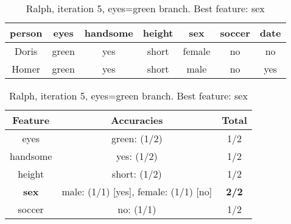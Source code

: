 \begin{table}[h!]
  \centering
  \begin{tabular}{cccccc|c}
    \toprule
    person      & eyes  & handsome & height & sex    & soccer & date\\
    \midrule
    Doris       & green & yes      & short  & female & no     & no  \\
    Homer       & green & yes      & short  & male   & no     & yes \\
    \bottomrule
  \end{tabular}

  \vspace{.5cm}

  \begin{tabular}{ccc}
    \toprule
    Feature           & Accuracies                              & Total\\
    \midrule
    eyes              & green: (1/2)                            & 1/2\\
    handsome          & yes: (1/2)                              & 1/2\\
    height            & short: (1/2)                            & 1/2\\
    \textbf{sex}      & male: (1/1) [yes], female: (1/1) [no]   & \textbf{2/2}\\
    soccer            & no: (1/1)                               & 1/2\\
    \bottomrule
  \end{tabular}
  \caption*{Ralph, iteration 5, eyes=green branch. Best feature: sex}
\end{table}
